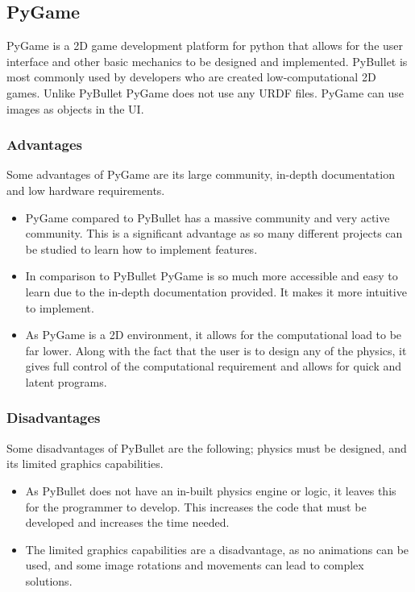 \documentclass[12pt]{article}
\begin{document}
\subsection{PyGame}

PyGame is a 2D game development platform for python that allows for the user interface and other basic mechanics to be designed and implemented. PyBullet is most commonly used by developers who are created low-computational 2D games. Unlike PyBullet PyGame does not use any URDF files. PyGame can use images as objects in the UI. 

\subsubsection{Advantages}
Some advantages of PyGame are its large community, in-depth documentation and low hardware requirements. 

\begin{itemize}
  \item PyGame compared to PyBullet has a massive community and very active community. This is a significant advantage as so many different projects can be studied to learn how to implement features. 
  \item In comparison to PyBullet PyGame is so much more accessible and easy to learn due to the in-depth documentation provided. It makes it more intuitive to implement. 

  \item As PyGame is a 2D environment, it allows for the computational load to be far lower. Along with the fact that the user is to design any of the physics, it gives full control of the computational requirement and allows for quick and latent programs.


\end{itemize}


\subsubsection{Disadvantages}

Some disadvantages of PyBullet are the following; physics must be designed, and its limited graphics capabilities. 
\begin{itemize}
  \item As PyBullet does not have an in-built physics engine or logic, it leaves this for the programmer to develop. This increases the code that must be developed and increases the time needed. 
  \item The limited graphics capabilities are a disadvantage, as no animations can be used, and some image rotations and movements can lead to complex solutions.

\end{itemize}
\end{document}
